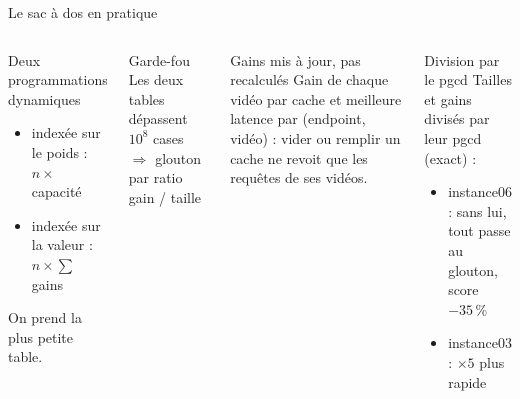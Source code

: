 \documentclass[aspectratio=169,xcolor=table]{pres}
\begin{document}
\begin{frame}{Le sac à dos en pratique}
  \begin{columns}[T]
    \begin{block}{Deux programmations dynamiques}
      \begin{itemize}
        \item indexée sur le poids : $n \times$ capacité
        \item indexée sur la valeur : $n \times \sum$ gains
      \end{itemize}
      On prend la plus petite table.
    \end{block}
    \begin{block}{Garde-fou}
      Les deux tables dépassent $10^8$ cases $\Rightarrow$ glouton par ratio gain / taille
    \end{block}
    \begin{block}{Gains mis à jour, pas recalculés}
      Gain de chaque vidéo par cache et meilleure latence par (endpoint, vidéo) :
      vider ou remplir un cache ne revoit que les requêtes de ses vidéos.
    \end{block}
    \begin{block}{Division par le pgcd}
      Tailles et gains divisés par leur pgcd (exact) :
      \begin{itemize}
        \item instance06 : sans lui, tout passe au glouton, score $-35\,\%$
        \item instance03 : $\times 5$ plus rapide
      \end{itemize}
    \end{block}
  \end{columns}
\end{frame}
\end{document}
